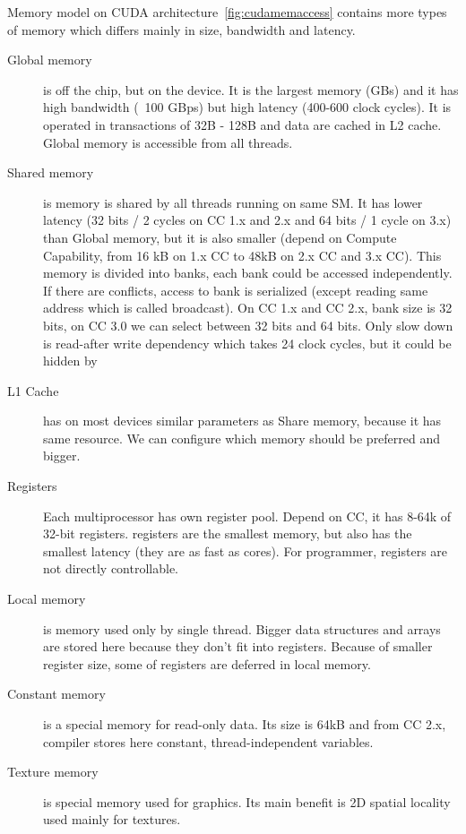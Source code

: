 Memory model on CUDA architecture~\autoref{fig:cudamemaccess} contains more types of memory which differs mainly in size, bandwidth and latency.
\begin{description}
\item[Global memory] is off the chip, but on the device. It is the largest memory (GBs) and it has high bandwidth (~100 GBps) but high latency (400-600 clock cycles). It is operated in transactions of 32B - 128B and data are cached in L2 cache. Global memory is accessible from all threads.
\item[Shared memory] is memory is shared by all threads running on same SM. It has lower latency (32 bits / 2 cycles on CC 1.x and 2.x and 64 bits / 1 cycle on 3.x) than Global memory, but it is also smaller (depend on Compute Capability, from 16 kB on 1.x CC to 48kB on 2.x CC and 3.x CC). This memory is divided into banks, each bank could be accessed independently. If there are conflicts, access to bank is serialized (except reading same address which is called broadcast). On CC 1.x and CC 2.x, bank size is 32 bits, on CC 3.0 we can select between 32 bits and 64 bits. Only slow down is read-after write dependency which takes 24 clock cycles, but it could be hidden by 
\item[L1 Cache] has on most devices similar parameters as Share memory, because it has same resource. We can configure which memory should be preferred and bigger.
\item[Registers] Each multiprocessor has own register pool. Depend on CC, it has 8-64k of 32-bit registers. registers are the smallest memory, but also has the smallest latency (they are as fast as cores). For programmer, registers are not directly controllable.
\item[Local memory] is memory used only by single thread. Bigger data structures and arrays are stored here because they don't fit into registers. Because of smaller register size, some of registers are deferred in local memory.
\item[Constant memory] is a special memory for read-only data. Its size is 64kB and from CC 2.x, compiler stores here constant, thread-independent variables.
\item[Texture memory] is special memory used for graphics. Its main benefit is 2D spatial locality used mainly for textures.
\end{description}

